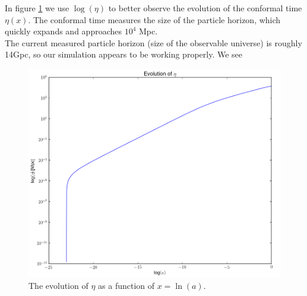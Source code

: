 \documentclass[a4paper]{article}
\begin{document}
In figure \ref{fig:etax} we use $\log(\eta)$ to better observe the evolution of the conformal time $\eta(x)$. The conformal time measures the size of the particle horizon, which quickly expands and approaches $10^4$ Mpc.\\

The current measured particle horizon (size of the observable universe) is roughly 14Gpc, so our simulation appears to be working properly. We see 



\begin{figure}[hb!]\label{fig:etax}
\includegraphics[scale=0.25]{eta_x2}
\caption{The evolution of $\eta$ as a function of $x = \ln(a)$.}
\end{figure}

\clearpage
\end{document}
